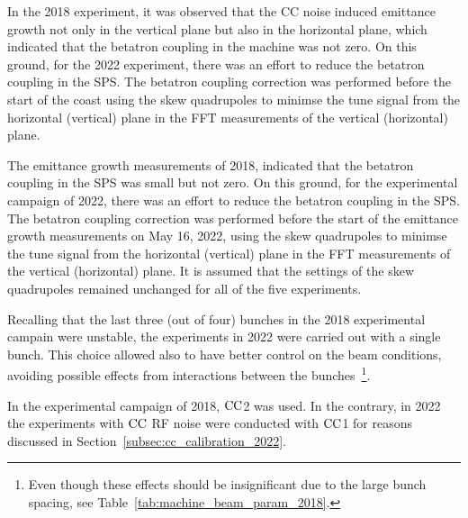In the 2018 experiment, it was observed that the CC noise induced emittance growth not only in the vertical plane but also in the horizontal plane, which indicated that the betatron coupling in the machine was not zero. On this ground, for the 2022 experiment, there was an effort to reduce the betatron coupling in the SPS. The betatron coupling correction was performed before the start of the coast using the skew quadrupoles to minimse the tune signal from the horizontal (vertical) plane in the FFT measurements of the vertical (horizontal) plane.

The emittance growth measurements of 2018, indicated that the betatron coupling in the SPS was small but not zero. On this ground, for the experimental campaign of 2022, there was an effort to reduce the betatron coupling in the SPS. The betatron coupling correction was performed before the start of the emittance growth measurements on May 16, 2022, using the skew quadrupoles to minimse the tune signal from the horizontal (vertical) plane in the FFT measurements of the vertical (horizontal) plane. It is assumed that the settings of the skew quadrupoles remained unchanged for all of the five experiments.

Recalling that the last three (out of four) bunches in the 2018 experimental campain were unstable, the experiments in 2022 were carried out with a single bunch. This choice allowed also to have better control on the beam conditions, avoiding possible effects from interactions between the bunches~\footnote{Even though these effects should be insignificant due to the large bunch spacing, see Table~\ref{tab:machine_beam_param_2018}.}.

In the experimental campaign of 2018, ${\mathrm{CC}}$2 was used. In the contrary, in 2022 the experiments with  ${\mathrm{CC}}$ RF noise were conducted with ${\mathrm{CC}}$1 for reasons discussed in Section~\ref{subsec:cc_calibration_2022}.

